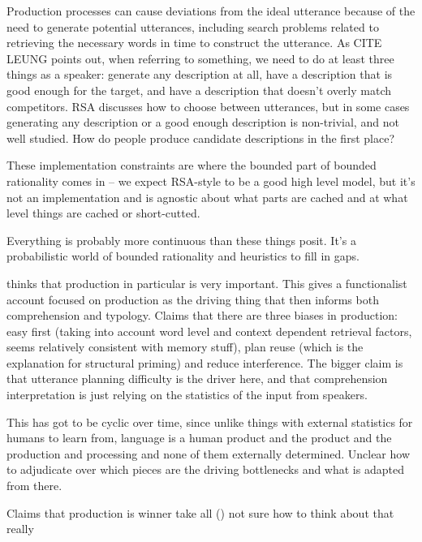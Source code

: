 \documentclass[]{article}
\begin{document}
Production processes can cause deviations from the ideal utterance because of the need to generate potential utterances, including search problems related to retrieving the necessary words in time to construct the utterance. As CITE LEUNG points out, when referring to something, we need to do at least three things as a speaker: generate any description at all, have a description that is good enough for the target, and have a description that doesn't overly match competitors. RSA discusses how to choose between utterances, but in some cases generating any description or a good enough description is non-trivial, and not well studied. How do people produce candidate descriptions in the first place? 



These implementation constraints are where the bounded part of bounded rationality comes in -- we expect RSA-style to be a good high level model, but it's not an implementation and is agnostic about what parts are cached and at what level things are cached or short-cutted. 

Everything is probably more continuous than these things posit. It's a probabilistic world of bounded rationality and heuristics to fill in gaps. 












\cite{macdonald2013} thinks that production in particular is very important. This gives a functionalist account focused on production as the driving thing that then informs both comprehension and typology. Claims that there are three biases in production: easy first (taking into account word level and context dependent retrieval factors, seems relatively consistent with memory stuff), plan reuse (which is the explanation for structural priming) and reduce interference. The bigger claim is that utterance planning difficulty is the driver here, and that comprehension interpretation is just relying on the statistics of the input from speakers. 

This has got to be cyclic over time, since unlike things with external statistics for humans to learn from, language is a human product and the product and the production and processing and none of them externally determined. Unclear how to adjudicate over which pieces are the driving bottlenecks and what is adapted from there. 

Claims that production is winner take all (\cite{macdonald2013}) not sure how to think about that really 
\end{document}
